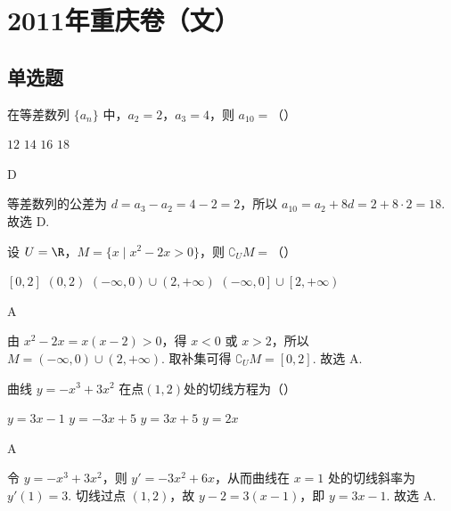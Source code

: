 \chapter{2011年重庆卷（文）}

\section{单选题}

\begin{problem}
在等差数列 \(\{a_{n}\}\) 中，\(a_{2} = 2\)，\(a_{3} = 4\)，则 \(a_{10} =\)（\quad）

\choices
    {\(12\)}
    {\(14\)}
    {\(16\)}
    {\(18\)}
\end{problem}

\begin{answer}
    D
\end{answer}

\begin{solution}
等差数列的公差为 \(d=a_{3}-a_{2}=4-2=2\)，所以
\(a_{10}=a_{2}+8d=2+8\cdot2=18\). 故选 D.
\end{solution}

\begin{problem}
设 \(U = \R\)，\(M = \{x \mid x^2 - 2x > 0\}\)，则 \(\complement_U M =\)（\quad）

\choices
    {\(\left[0,2\right]\)}
    {\(\left(0,2\right)\)}
    {\(\left(-\infty,0\right)\cup\left(2,+\infty\right)\)}
    {\(\left(-\infty,0\right]\cup\left[2,+\infty\right)\)}
\end{problem}

\begin{answer}
    A
\end{answer}

\begin{solution}
由 \(x^{2}-2x=x(x-2)>0\)，得 \(x<0\) 或 \(x>2\)，所以
\(M=(-\infty,0)\cup(2,+\infty)\). 取补集可得
\(\complement_{U}M=[0,2]\). 故选 A.
\end{solution}

\begin{problem}
曲线 \( y = -x^{3} + 3x^{2} \) 在点\(\left(1,2\right)\)处的切线方程为（\quad）

\choices
    {\(y = 3x - 1\)}
    {\(y = -3x + 5\)}
    {\(y = 3x + 5\)}
    {\(y = 2x\)}
\end{problem}

\begin{answer}
    A
\end{answer}

\begin{solution}
令 \(y=-x^{3}+3x^{2}\)，则 \(y'=-3x^{2}+6x\)，从而曲线在 \(x=1\) 处的切线斜率为 \(y'(1)=3\). 切线过点 \((1,2)\)，故
\(y-2=3(x-1)\)，即 \(y=3x-1\). 故选 A.
\end{solution}

